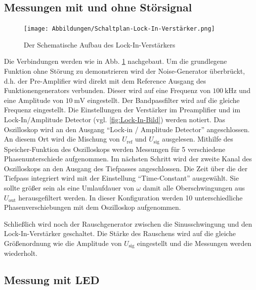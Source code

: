 \subsection{Messungen mit und ohne Störsignal}
\begin{figure}
    \texttt{[image: Abbildungen/Schaltplan-Lock-In-Verstärker.png]}
    \caption{Der Schematische Aufbau des Lock-In-Verstärkers \cite[][]{man:v303}}
    \label{fig:Lock-In-Schema}
\end{figure}
Die Verbindungen werden wie in Abb. \ref{fig:Lock-In-Schema} nachgebaut.
Um die grundlegene Funktion ohne Störung zu demonstrieren wird der Noise-Generator überbrückt,
d.h. der Pre-Amplifier wird direkt mit dem Reference Ausgang des Funktionengenerators verbunden.
Dieser wird auf eine Frequenz von $\qty[]{100}{\kilo\hertz}$ und eine Amplitude von $\qty{10}{\milli\volt}$ eingestellt.
Der Bandpassfilter wird auf die gleiche Frequenz eingestellt.
Die Einstellungen der Verstärker im Preamplifier und im Lock-In/Amplitude Detector (vgl. \ref{fig:Lock-In-Bild}) werden notiert. 
Das Oszilloskop wird an den Ausgang \enquote{Lock-in / Amplitude Detector} angeschlossen.
An diesem Ort wird die Mischung von $U_\text{ref}$  und $U_\text{sig}$ ausgelesen.
Mithilfe des Speicher-Funktion des Oszilloskops werden Messungen für 5 verschiedene Phasenunterschiede aufgenommen.
Im nächsten Schritt wird der zweite Kanal des Oszilloskops an den Ausgang des Tiefpasses angeschlossen.
Die Zeit über die der Tiefpass integriert wird mit der Einstellung \enquote{Time-Constant} ausgewählt. 
Sie sollte größer sein als eine Umlaufdauer von $\omega$ damit alle Oberschwingungen aus $U_\text{out}$ herausgefiltert werden.
In dieser Konfiguration werden 10 unterschiedliche Phasenverschiebungen mit dem Oszilloskop aufgenommen.

Schließlich wird noch der Rauschgenerator zwischen die Sinusschwingung und den Lock-In-Verstärker geschaltet.
Die Stärke des Rauschens wird auf die gleiche Größenordnung wie die Amplitude von $U_\text{sig}$ eingestellt 
und die Messungen werden wiederholt.

\subsection{Messung mit LED}

